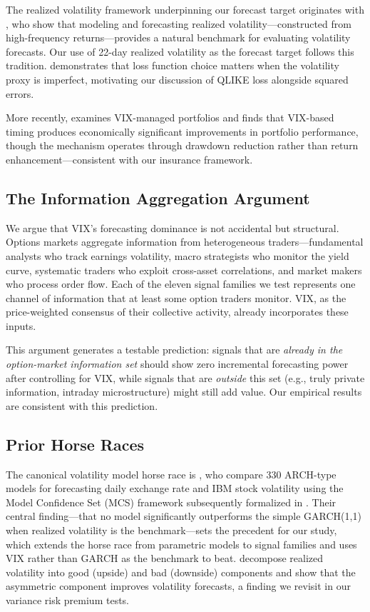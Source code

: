 \documentclass[12pt,a4paper]{article}
\begin{document}
The realized volatility framework underpinning our forecast target originates with \citet{andersen2003}, who show that modeling and forecasting realized volatility---constructed from high-frequency returns---provides a natural benchmark for evaluating volatility forecasts. Our use of 22-day realized volatility as the forecast target follows this tradition. \citet{patton2011} demonstrates that loss function choice matters when the volatility proxy is imperfect, motivating our discussion of QLIKE loss alongside squared errors.

More recently, \citet{bozovic2024} examines VIX-managed portfolios and finds that VIX-based timing produces economically significant improvements in portfolio performance, though the mechanism operates through drawdown reduction rather than return enhancement---consistent with our insurance framework.

\subsection{The Information Aggregation Argument}

We argue that VIX's forecasting dominance is not accidental but structural. Options markets aggregate information from heterogeneous traders---fundamental analysts who track earnings volatility, macro strategists who monitor the yield curve, systematic traders who exploit cross-asset correlations, and market makers who process order flow. Each of the eleven signal families we test represents one channel of information that at least some option traders monitor. VIX, as the price-weighted consensus of their collective activity, already incorporates these inputs.

This argument generates a testable prediction: signals that are \emph{already in the option-market information set} should show zero incremental forecasting power after controlling for VIX, while signals that are \emph{outside} this set (e.g., truly private information, intraday microstructure) might still add value. Our empirical results are consistent with this prediction.

\subsection{Prior Horse Races}

The canonical volatility model horse race is \citet{hansen2005}, who compare 330 ARCH-type models for forecasting daily exchange rate and IBM stock volatility using the Model Confidence Set (MCS) framework subsequently formalized in \citet{hansen2011mcs}. Their central finding---that no model significantly outperforms the simple GARCH(1,1) when realized volatility is the benchmark---sets the precedent for our study, which extends the horse race from parametric models to signal families and uses VIX rather than GARCH as the benchmark to beat. \citet{patton2015} decompose realized volatility into good (upside) and bad (downside) components and show that the asymmetric component improves volatility forecasts, a finding we revisit in our variance risk premium tests.
\end{document}
